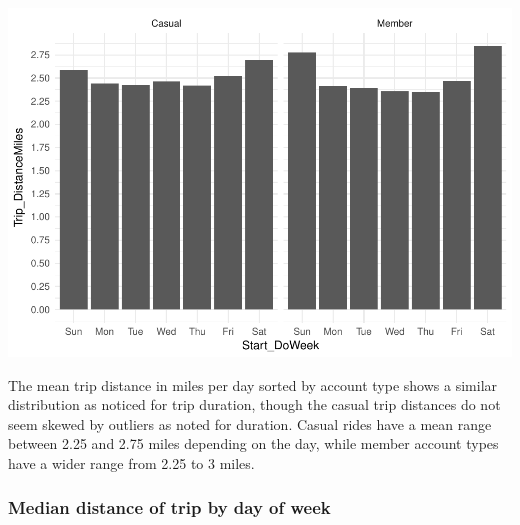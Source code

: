 \documentclass[]{article}
\newenvironment{Shaded}{\begin{snugshade}}{\end{snugshade}}
\newcommand{\KeywordTok}[1]{\textcolor[rgb]{0.13,0.29,0.53}{\textbf{#1}}}
\newcommand{\DataTypeTok}[1]{\textcolor[rgb]{0.13,0.29,0.53}{#1}}
\newcommand{\DecValTok}[1]{\textcolor[rgb]{0.00,0.00,0.81}{#1}}
\newcommand{\FloatTok}[1]{\textcolor[rgb]{0.00,0.00,0.81}{#1}}
\newcommand{\StringTok}[1]{\textcolor[rgb]{0.31,0.60,0.02}{#1}}
\newcommand{\OperatorTok}[1]{\textcolor[rgb]{0.81,0.36,0.00}{\textbf{#1}}}
\newcommand{\NormalTok}[1]{#1}
\begin{document}
\begin{Shaded}
\end{Shaded}

\includegraphics{Nice_Ride_Project_Stat_ReportDRAFT_files/figure-latex/unnamed-chunk-9-1.pdf}

The mean trip distance in miles per day sorted by account type shows a
similar distribution as noticed for trip duration, though the casual
trip distances do not seem skewed by outliers as noted for duration.
Casual rides have a mean range between 2.25 and 2.75 miles depending on
the day, while member account types have a wider range from 2.25 to 3
miles.

\subsubsection{Median distance of trip by day of
week}\label{median-distance-of-trip-by-day-of-week}
\end{document}
